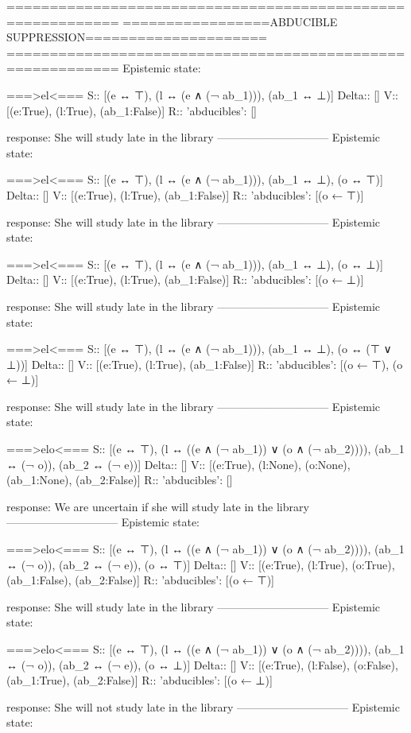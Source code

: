 ===========================================================
=================ABDUCIBLE SUPPRESSION=====================
===========================================================
Epistemic state:

===>el<===
S:: [(e ↔ ⊤), (l ↔ (e ∧ (¬ ab_1))), (ab_1 ↔ ⊥)]
Delta:: []
V:: [(e:True), (l:True), (ab_1:False)]
R:: {'abducibles': []}

response: She will study late in the library
------------------------------
Epistemic state:

===>el<===
S:: [(e ↔ ⊤), (l ↔ (e ∧ (¬ ab_1))), (ab_1 ↔ ⊥), (o ↔ ⊤)]
Delta:: []
V:: [(e:True), (l:True), (ab_1:False)]
R:: {'abducibles': [(o ← ⊤)]}

response: She will study late in the library
------------------------------
Epistemic state:

===>el<===
S:: [(e ↔ ⊤), (l ↔ (e ∧ (¬ ab_1))), (ab_1 ↔ ⊥), (o ↔ ⊥)]
Delta:: []
V:: [(e:True), (l:True), (ab_1:False)]
R:: {'abducibles': [(o ← ⊥)]}

response: She will study late in the library
------------------------------
Epistemic state:

===>el<===
S:: [(e ↔ ⊤), (l ↔ (e ∧ (¬ ab_1))), (ab_1 ↔ ⊥), (o ↔ (⊤ ∨ ⊥))]
Delta:: []
V:: [(e:True), (l:True), (ab_1:False)]
R:: {'abducibles': [(o ← ⊤), (o ← ⊥)]}

response: She will study late in the library
------------------------------
Epistemic state:

===>elo<===
S:: [(e ↔ ⊤), (l ↔ ((e ∧ (¬ ab_1)) ∨ (o ∧ (¬ ab_2)))), (ab_1 ↔ (¬ o)), (ab_2 ↔ (¬ e))]
Delta:: []
V:: [(e:True), (l:None), (o:None), (ab_1:None), (ab_2:False)]
R:: {'abducibles': []}

response: We are uncertain if she will study late in the library
------------------------------
Epistemic state:

===>elo<===
S:: [(e ↔ ⊤), (l ↔ ((e ∧ (¬ ab_1)) ∨ (o ∧ (¬ ab_2)))), (ab_1 ↔ (¬ o)), (ab_2 ↔ (¬ e)), (o ↔ ⊤)]
Delta:: []
V:: [(e:True), (l:True), (o:True), (ab_1:False), (ab_2:False)]
R:: {'abducibles': [(o ← ⊤)]}

response: She will study late in the library
------------------------------
Epistemic state:

===>elo<===
S:: [(e ↔ ⊤), (l ↔ ((e ∧ (¬ ab_1)) ∨ (o ∧ (¬ ab_2)))), (ab_1 ↔ (¬ o)), (ab_2 ↔ (¬ e)), (o ↔ ⊥)]
Delta:: []
V:: [(e:True), (l:False), (o:False), (ab_1:True), (ab_2:False)]
R:: {'abducibles': [(o ← ⊥)]}

response: She will not study late in the library
------------------------------
Epistemic state:

